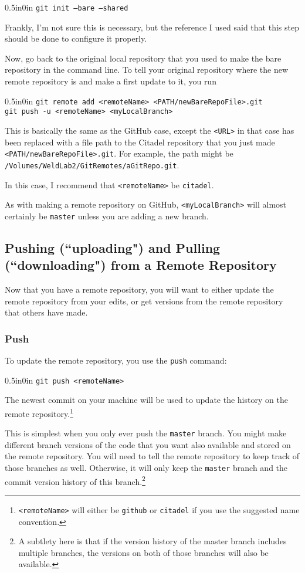 \documentclass[11pt]{article}
\newcommand{\code}[1]{\begin{adjustwidth}{0.5in}{0in}
    \texttt{#1}
    \end{adjustwidth}}
\begin{document}
\code{git init --bare --shared}

Frankly, I'm not sure this is necessary, but the reference I used said that this step should be done to configure it properly.

Now, go back to the original local repository that you used to make the bare repository in the command line.  To tell your original repository where the new remote repository is and make a first update to it, you run

\code{git remote add <remoteName> <PATH/newBareRepoFile>.git\\
git push -u <remoteName> <myLocalBranch>}  

This is basically the same as the GitHub case, except the \texttt{<URL>} in that case has been replaced with a file path to the Citadel repository that you just made \texttt{<PATH/newBareRepoFile>.git}.  For example, the path might be \texttt{/Volumes/WeldLab2/GitRemotes/aGitRepo.git}.

In this case, I recommend that \texttt{<remoteName>} be \texttt{citadel}.

As with making a remote repository on GitHub, \texttt{<myLocalBranch>} will almost certainly be \texttt{master} unless you are adding a new branch.

\subsection{Pushing (``uploading") and Pulling (``downloading") from a Remote Repository}
\label{sec:PushPull}

Now that you have a remote repository, you will want to either update the remote repository from your edits, or get versions from the remote repository that others have made.

\subsubsection{Push}
To update the remote repository, you use the \texttt{push} command:

\code{git push <remoteName>}

The newest commit on your machine will be used to update the history on the remote repository.\footnote{\texttt{<remoteName>} will either be \texttt{github} or \texttt{citadel} if you use the suggested name convention.}

This is simplest when you only ever push the \texttt{master} branch.  You might make different branch versions of the code that you want also available and stored on the remote repository.  You will need to tell the remote repository to keep track of those branches as well.  Otherwise, it will only keep the \texttt{master} branch and the commit version history of this branch.\footnote{A subtlety here is that if the version history of the master branch includes multiple branches, the versions on both of those branches will also be available.}
\end{document}
